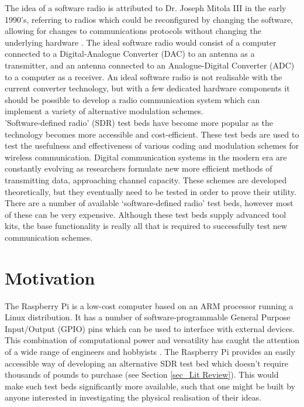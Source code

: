 \documentclass[../main.tex]{subfiles}
\begin{document}
The idea of a software radio is attributed to Dr. Joseph Mitola III in the early 1990's, referring to radios which could be reconfigured by changing the software, allowing for changes to communications protocols without changing the underlying hardware \cite{https://ieeexplore.ieee.org/stamp/stamp.jsp?tp=&arnumber=267870}.
The ideal software radio would consist of a computer connected to a Digital-Analogue Converter (DAC) to an antenna as a transmitter, and an antenna connected to an Analogue-Digital Converter (ADC) to a computer as a receiver.
An ideal software radio is not realisable with the current converter technology, but with a few dedicated hardware components it should be possible to develop a radio communication system which can implement a variety of alternative modulation schemes.\\

'Software-defined radio' (SDR) test beds have become more popular as the technology becomes more accessible and cost-efficient.
These test beds are used to test the usefulness and effectiveness of various coding and modulation schemes for wireless communication.
Digital communication systems in the modern era are constantly evolving as researchers formulate new more efficient methods of transmitting data, approaching channel capacity.
These schemes are developed theoretically, but they eventually need to be tested in order to prove their utility.
There are a number of available ‘software-defined radio’ test beds, however most of these can be very expensive.
Although these test beds supply advanced tool kits, the base functionality is really all that is required to successfully test new communication schemes.\\



\section{Motivation}

The Raspberry Pi is a low-cost computer based on an ARM processor running a Linux distribution.
It has a number of software-programmable General Purpose Input/Output (GPIO) pins which can be used to interface with external devices.
This combination of computational power and versatility has  caught the attention of a wide range of engineers and hobbyists \cite{https://www.makeuseof.com/tag/9-things-wanted-know-raspberry-pi/}.
The Raspberry Pi provides an easily accessible way of developing an alternative SDR test bed which doesn't require thousands of pounds to purchase (see Section \ref{sec_Lit Review}).
This would make such test beds significantly more available, such that one might be built by anyone interested in investigating the physical realisation of their ideas.\\
\end{document}
